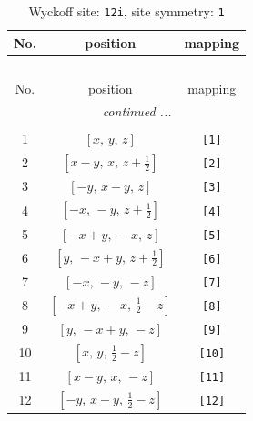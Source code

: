 \documentclass[fleqn,8pt]{jsarticle}
\begin{document}
\renewcommand{\arraystretch}{1.2}
\begin{longtable}{ccc}
\caption{Wyckoff site: {\tt 12i}, site symmetry: {\tt 1}}
 \\
 \hline \hline
No. & position & mapping \\ \hline \endfirsthead

\multicolumn{2}{l}{\tablename\ \thetable{}} \\
 \hline \hline
No. & position & mapping \\ \hline \endhead

 \hline \hline
\multicolumn{2}{r}{\footnotesize\it continued ...} \\ \endfoot

 \hline \hline
\multicolumn{2}{r}{} \\ \endlastfoot

1 & $\left[ x,\, y,\, z \right]$ & {\tt [1]} \\ \hline
2 & $\left[ x - y,\, x,\, z + \frac{1}{2} \right]$ & {\tt [2]} \\ \hline
3 & $\left[ - y,\, x - y,\, z \right]$ & {\tt [3]} \\ \hline
4 & $\left[ - x,\, - y,\, z + \frac{1}{2} \right]$ & {\tt [4]} \\ \hline
5 & $\left[ - x + y,\, - x,\, z \right]$ & {\tt [5]} \\ \hline
6 & $\left[ y,\, - x + y,\, z + \frac{1}{2} \right]$ & {\tt [6]} \\ \hline
7 & $\left[ - x,\, - y,\, - z \right]$ & {\tt [7]} \\ \hline
8 & $\left[ - x + y,\, - x,\, \frac{1}{2} - z \right]$ & {\tt [8]} \\ \hline
9 & $\left[ y,\, - x + y,\, - z \right]$ & {\tt [9]} \\ \hline
10 & $\left[ x,\, y,\, \frac{1}{2} - z \right]$ & {\tt [10]} \\ \hline
11 & $\left[ x - y,\, x,\, - z \right]$ & {\tt [11]} \\ \hline
12 & $\left[ - y,\, x - y,\, \frac{1}{2} - z \right]$ & {\tt [12]} \\
\end{longtable}
\end{document}
